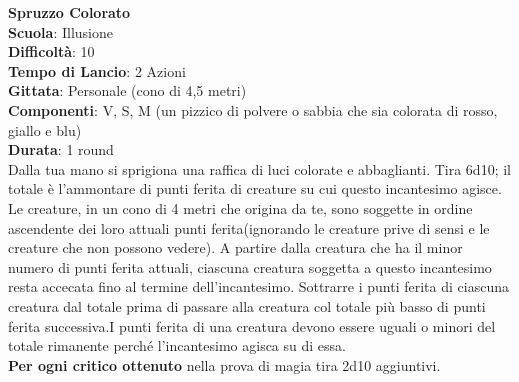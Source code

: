\begin{multicols}{2}
\medskip\textbf{Spruzzo Colorato}\\
\textbf{Scuola}: Illusione\\
\textbf{Difficoltà}:  10\\
\textbf{Tempo di Lancio}: 2 Azioni\\
\textbf{Gittata}: Personale (cono di 4,5 metri)\\
\textbf{Componenti}: V, S, M (un pizzico di polvere o sabbia che sia colorata di rosso, giallo e blu)\\
\textbf{Durata}: 1 round\\
Dalla tua mano si sprigiona una raffica di luci colorate e abbaglianti. Tira 6d10; il totale è l’ammontare di punti ferita di creature su cui questo incantesimo agisce. Le creature, in un cono di 4 metri che origina da te, sono soggette in ordine ascendente dei loro attuali punti ferita(ignorando le creature prive di sensi e le creature  che non possono vedere). A partire dalla creatura che ha il minor numero di punti ferita attuali, ciascuna creatura soggetta a questo incantesimo resta accecata fino al termine dell'incantesimo. Sottrarre i punti ferita di ciascuna creatura dal totale prima di passare alla creatura col totale più basso di punti ferita successiva.I punti ferita  di una creatura devono essere uguali o minori del totale rimanente perché  l'incantesimo agisca su di essa. \\
\textbf{Per ogni critico ottenuto} nella prova di magia tira 2d10 aggiuntivi.


\end{multicols}
